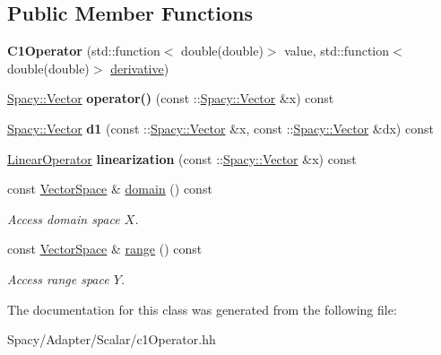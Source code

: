 \subsection*{Public Member Functions}
\begin{DoxyCompactItemize}
\item 
\hypertarget{classSpacy_1_1Scalar_1_1C1Operator_a97f719a6349064072c892972663e70c7}{}{\bfseries C1\+Operator} (std\+::function$<$ double(double)$>$ value, std\+::function$<$ double(double)$>$ \hyperlink{namespaceSpacy_a002fe344fa6d04a6ac59a74ea25fddb6}{derivative})\label{classSpacy_1_1Scalar_1_1C1Operator_a97f719a6349064072c892972663e70c7}

\item 
\hypertarget{classSpacy_1_1Scalar_1_1C1Operator_a9ab2d8a905a70dd848c984e532b50fed}{}\hyperlink{classSpacy_1_1Vector}{Spacy\+::\+Vector} {\bfseries operator()} (const \+::\hyperlink{classSpacy_1_1Vector}{Spacy\+::\+Vector} \&x) const \label{classSpacy_1_1Scalar_1_1C1Operator_a9ab2d8a905a70dd848c984e532b50fed}

\item 
\hypertarget{classSpacy_1_1Scalar_1_1C1Operator_a56908ac8a9cd1e959f15e3f71a00a01b}{}\hyperlink{classSpacy_1_1Vector}{Spacy\+::\+Vector} {\bfseries d1} (const \+::\hyperlink{classSpacy_1_1Vector}{Spacy\+::\+Vector} \&x, const \+::\hyperlink{classSpacy_1_1Vector}{Spacy\+::\+Vector} \&dx) const \label{classSpacy_1_1Scalar_1_1C1Operator_a56908ac8a9cd1e959f15e3f71a00a01b}

\item 
\hypertarget{classSpacy_1_1Scalar_1_1C1Operator_acefccd4cac61750dad6053a963b10944}{}\hyperlink{structSpacy_1_1Scalar_1_1LinearOperator}{Linear\+Operator} {\bfseries linearization} (const \+::\hyperlink{classSpacy_1_1Vector}{Spacy\+::\+Vector} \&x) const \label{classSpacy_1_1Scalar_1_1C1Operator_acefccd4cac61750dad6053a963b10944}

\item 
\hypertarget{classSpacy_1_1OperatorBase_a2588f9b3e0188820c4c494e63293dc6f}{}const \hyperlink{classSpacy_1_1VectorSpace}{Vector\+Space} \& \hyperlink{classSpacy_1_1OperatorBase_a2588f9b3e0188820c4c494e63293dc6f}{domain} () const \label{classSpacy_1_1OperatorBase_a2588f9b3e0188820c4c494e63293dc6f}

\begin{DoxyCompactList}\small\item\em Access domain space $X$. \end{DoxyCompactList}\item 
\hypertarget{classSpacy_1_1OperatorBase_ab19d3b7a6f290b1079248f1e567e53d6}{}const \hyperlink{classSpacy_1_1VectorSpace}{Vector\+Space} \& \hyperlink{classSpacy_1_1OperatorBase_ab19d3b7a6f290b1079248f1e567e53d6}{range} () const \label{classSpacy_1_1OperatorBase_ab19d3b7a6f290b1079248f1e567e53d6}

\begin{DoxyCompactList}\small\item\em Access range space $Y$. \end{DoxyCompactList}\end{DoxyCompactItemize}


The documentation for this class was generated from the following file\+:\begin{DoxyCompactItemize}
\item 
Spacy/\+Adapter/\+Scalar/c1\+Operator.\+hh\end{DoxyCompactItemize}
